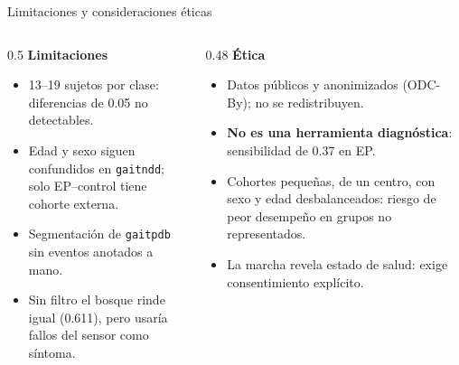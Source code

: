 \documentclass[aspectratio=169,10pt]{beamer}
\begin{document}
\begin{frame}{Limitaciones y consideraciones éticas}
  \begin{columns}[T]
    \begin{column}{0.5\textwidth}
      \textbf{Limitaciones}
      \begin{itemize}
        \item 13--19 sujetos por clase: diferencias de 0.05 no detectables.
        \item Edad y sexo siguen confundidos en \texttt{gaitndd}; solo EP--control tiene cohorte externa.
        \item Segmentación de \texttt{gaitpdb} sin eventos anotados a mano.
        \item Sin filtro el bosque rinde igual (0.611), pero usaría fallos del sensor como síntoma.
      \end{itemize}
    \end{column}
    \begin{column}{0.48\textwidth}
      \textbf{Ética}
      \begin{itemize}
        \item Datos públicos y anonimizados (ODC-By); no se redistribuyen.
        \item \textbf{No es una herramienta diagnóstica}: sensibilidad de 0.37 en EP.
        \item Cohortes pequeñas, de un centro, con sexo y edad desbalanceados: riesgo de peor desempeño en grupos no representados.
        \item La marcha revela estado de salud: exige consentimiento explícito.
      \end{itemize}
    \end{column}
  \end{columns}
\end{frame}
\end{document}
